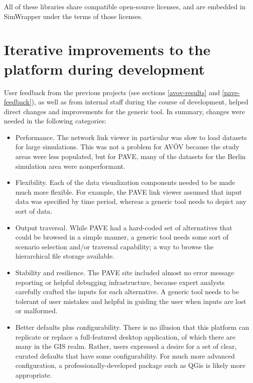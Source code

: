 All of these libraries share compatible open-source licenses, and are embedded in SimWrapper under the terms of those licenses.


\hypertarget{simwrapper-modifications-necessary}{%
\section{Iterative improvements to the platform during development}
\label{simwrapper-modifications-necessary}}

User feedback from the previous projects (see sections \ref{avov-results} and \ref{pave-feedback}), as well as from internal staff during the course of development, helped direct changes and improvements for the generic tool. In summary, changes were needed in the following categories:

\begin{itemize}
\item
  Performance. The network link viewer in particular was slow to load
  datasets for large simulations. This was not a problem for AVÖV
  because the study areas were less populated, but for PAVE, many
  of the datasets for the Berlin simulation area were nonperformant.
\item
  Flexibility. Each of the data visualization components needed to be
  made much more flexible. For example, the PAVE link viewer assumed
  that input data was specified by time period, whereas a generic tool
  needs to depict any sort of data.
\item
  Output traversal. While PAVE had a hard-coded set of alternatives that
  could be browsed in a simple manner, a generic tool needs some sort of
  scenario selection and/or traversal capability; a way to browse the
  hierarchical file storage available.
\item
  Stability and resilience. The PAVE site included almost no error
  message reporting or helpful debugging infrastructure, because expert
  analysts carefully crafted the inputs for each alternative. A generic
  tool needs to be tolerant of user mistakes and helpful in guiding the
  user when inputs are lost or malformed.
\item
  Better defaults plus configurability. There is no illusion that this
  platform can replicate or replace a full-featured desktop application,
  of which there are many in the \gls{GIS} realm. Rather, users expressed a
  desire for a set of clear, curated defaults that have some
  configurability. For much more advanced configuration, a
  professionally-developed package such as QGis is likely more appropriate.
\end{itemize}

